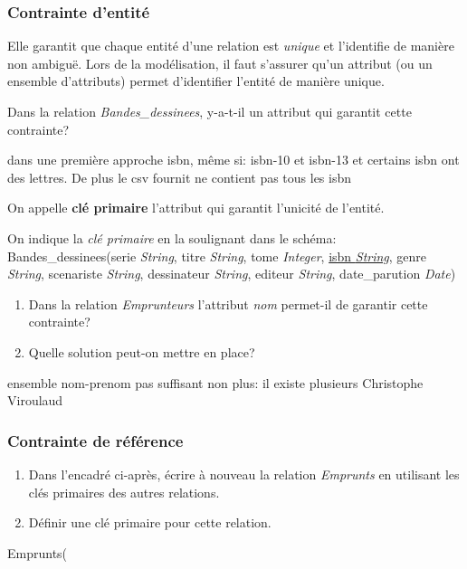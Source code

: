 \documentclass[a4paper,11pt]{article}
\begin{document}
\begin{Form}
\subsubsection{Contrainte d'entité}
Elle garantit que chaque entité d'une relation est \emph{unique} et l'identifie de manière non ambiguë. Lors de la modélisation, il faut s'assurer qu'un attribut (ou un ensemble d'attributs) permet d'identifier l'entité de manière unique.
\begin{activite}
Dans la relation \emph{Bandes\_dessinees}, y-a-t-il un attribut qui garantit cette contrainte?
\begin{commentprof}
dans une première approche isbn, même si: isbn-10 et isbn-13 et certains isbn ont des lettres. De plus le csv fournit ne contient pas tous les isbn
\end{commentprof}
\end{activite}
\begin{aretenir}[]
On appelle \textbf{clé primaire} l'attribut qui garantit l'unicité de l'entité.
\end{aretenir}
On indique la \emph{clé primaire} en la soulignant dans le schéma:\\
Bandes\_dessinees(serie \emph{String}, titre \emph{String}, tome \emph{Integer}, \underline{isbn \emph{String}}, genre \emph{String}, scenariste \emph{String}, dessinateur \emph{String}, editeur \emph{String}, date\_parution \emph{Date})
\begin{activite}
\begin{enumerate}
\item Dans la relation \emph{Emprunteurs} l'attribut \emph{nom} permet-il de garantir cette contrainte?
\item Quelle solution peut-on mettre en place?
\end{enumerate}
\begin{commentprof}
ensemble nom-prenom pas suffisant non plus: il existe plusieurs  Christophe Viroulaud
\end{commentprof}
\end{activite}
\subsubsection{Contrainte de référence}
\begin{activite}
\begin{enumerate}
\item Dans l'encadré ci-après, écrire à nouveau la relation \emph{Emprunts} en utilisant les clés primaires des autres relations.
\item Définir une clé primaire pour cette relation.
\end{enumerate}
\end{activite}
\begin{framed}
Emprunts(
\end{framed}


\end{Form}
\end{document}
